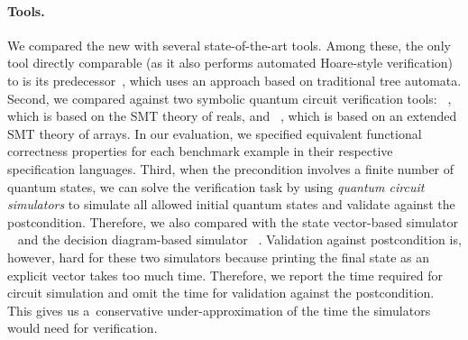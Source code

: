 \paragraph{Tools.}
We compared the new \tool with several state-of-the-art tools.
Among these, the only tool directly comparable (as it also performs automated
Hoare-style verification) to \tool is its predecessor~\cite{ChenCLLTY23, ChenCLLT23},
which uses an approach based on traditional tree automata.
%
Second, we compared \tool against two symbolic quantum circuit verification
tools: \symqv~\cite{BauerMarquartLS23}, which is based on the SMT theory of
reals, and \caal~\cite{chen2023theory}, which is based on an extended SMT theory
of arrays.
In our evaluation, we specified equivalent functional correctness properties for
each benchmark example in their respective specification languages.
%
Third, when the precondition involves a finite number of quantum states, we can
solve the verification task by using \emph{quantum circuit simulators} to
simulate all allowed initial quantum states and validate against the postcondition.
Therefore, we also compared \tool with the state vector-based simulator
\svsim~\cite{li2021svsim} and the decision diagram-based simulator
\sliqsim~\cite{TsaiJJ21}. Validation against postcondition is, however, hard for
these two simulators because printing the final state as an explicit vector
takes too much time. Therefore, we report the time required for circuit
simulation and omit the time for validation against the postcondition.
This gives us a~conservative under-approximation of the time the simulators
would need for verification. 

